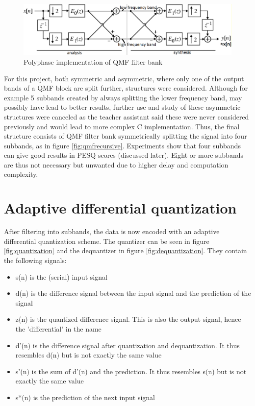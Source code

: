 \documentclass[a4paper]{article}
\begin{document}
\begin{figure}[hbt]
\includegraphics[width = \textwidth]{qmf}
\caption{Polyphase implementation of QMF filter bank}
\label{fig:qmf}
\end{figure}

For this project, both symmetric and asymmetric, where only one of the output bands of a QMF block are split further, structures were considered. Although for example 5 subbands created by always splitting the lower frequency band, may possibly have lead to better results, further use and study of these asymmetric structures were canceled as the teacher assistant said these were never considered previously and would lead to more complex C implementation. Thus, the final structure consists of QMF filter bank symmetrically splitting the signal into four subbands, as in figure \ref{fig:qmfrecursive}. Experiments show that four subbands can give good results in PESQ scores (discussed later). Eight or more subbands are thus not necessary but unwanted due to higher delay and computation complexity.

\section{Adaptive differential quantization}
After filtering into subbands, the data is now encoded with an adaptive differential quantization scheme. The quantizer can be seen in figure \ref{fig:quantization} and the dequantizer in figure \ref{fig:dequantization}. They contain the following signals:

\begin{itemize}
\item s(n) is the (serial) input signal
\item d(n) is the difference signal between the input signal and the prediction of the signal
\item z(n) is the quantized difference signal. This is also the output signal, hence the 'differential' in the name
\item d'(n) is the difference signal after quantization and dequantization. It thus resembles d(n) but is not exactly the same value
\item s'(n) is the sum of d'(n) and the prediction. It thus resembles s(n) but is not exactly the same value
\item s*(n) is the prediction of the next input signal 
\end{itemize}
\end{document}
